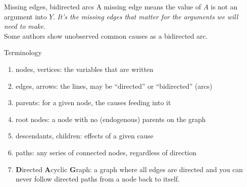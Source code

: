 \documentclass[xcolor=dvipsnames]{beamer}
\begin{document}
\begin{frame}{Missing edges, bidirected arcs}
\small        
         A missing edge means the value of $A$ is not an argument into $Y$. \textit{It's the missing edges that matter for the arguments we will need to make.}\\
        \bigskip
                 Some authors show unobserved common causes as a bidirected arc. \\
        \bigskip
        \begin{center}
\end{center}
\end{frame}

\begin{frame}{Terminology}
\begin{enumerate}
\item<1-> nodes, vertices: the variables that are written
\item<2-> edges, arrows: the lines,  may be ``directed'' or ``bidirected'' (arcs)
\item<3-> parents: for a given node, the causes feeding into it
\item<4-> root nodes: a node with no (endogenous) parents on the graph
\item<5-> descendants, children: effects of a given cause
\item<6-> paths: any series of connected nodes, regardless of direction
\item<6-> \textbf{D}irected \textbf{A}cyclic \textbf{G}raph: a graph where all edges are directed and you can never follow directed paths from a node back to itself.
\end{enumerate}
\end{frame}
\end{document}
